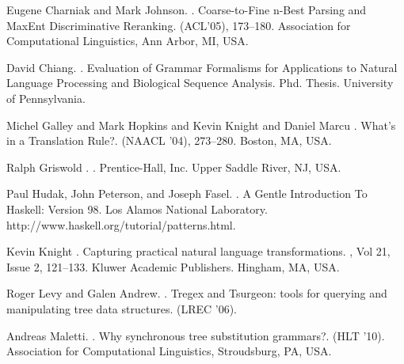 \documentclass[a4,11pt]{article}
\begin{document}
\begin{thebibliography}{}
Eugene Charniak and Mark Johnson.
.
\newblock Coarse-to-Fine n-Best Parsing and MaxEnt Discriminative Reranking.
 (ACL'05), 173--180.
\newblock Association for Computational Linguistics, Ann Arbor, MI, USA.

David Chiang.
.
\newblock Evaluation of Grammar Formalisms for Applications to Natural Language Processing and Biological Sequence Analysis.
\newblock Phd. Thesis.
\newblock University of Pennsylvania.

Michel Galley and Mark Hopkins and Kevin Knight and Daniel Marcu
.
\newblock What's in a Translation Rule?.
 (NAACL '04), 273--280.
\newblock Boston, MA, USA.

Ralph Griswold
.
.
\newblock Prentice-Hall, Inc.
\newblock Upper Saddle River, NJ, USA.


Paul Hudak, John Peterson, and Joseph Fasel.
.
\newblock A Gentle Introduction To Haskell: Version 98.
\newblock Los Alamos National Laboratory. 
\newblock http://www.haskell.org/tutorial/patterns.html.


Kevin Knight
.
\newblock Capturing practical natural language transformations.
, Vol 21, Issue 2, 121--133.
\newblock Kluwer Academic Publishers.
\newblock Hingham, MA, USA.


Roger Levy and Galen Andrew.
.
\newblock Tregex and Tsurgeon: tools for querying and manipulating tree data structures.
 (LREC '06).

Andreas Maletti.
. 
\newblock Why synchronous tree substitution grammars?.
  (HLT '10).
\newblock Association for Computational Linguistics, Stroudsburg, PA, USA.


\end{thebibliography}
\end{document}
